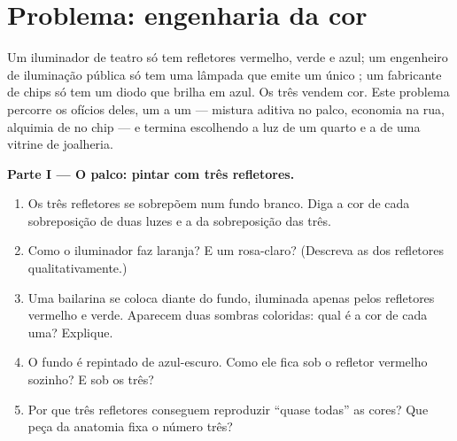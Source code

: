 \section{Problema: engenharia da cor}

\begin{problem}
\label{pb:g11:color-light-sources:1}
Um iluminador de teatro só tem refletores vermelho, verde e azul; um
engenheiro de iluminação pública só tem uma lâmpada que emite um único
; um fabricante de chips só tem um diodo que brilha em
azul. Os três vendem cor. Este problema percorre os ofícios deles, um a
um --- mistura aditiva no palco, economia  na rua, alquimia
de  no chip --- e termina escolhendo a luz de um quarto e a de uma
vitrine de joalheria.

\medskip
\noindent\textbf{Parte I --- O palco: pintar com três refletores.}
\begin{enumerate}
  \item Os três refletores se sobrepõem num fundo branco. Diga a cor de
        cada sobreposição de duas luzes e a da sobreposição das três.
  \item Como o iluminador faz laranja? E um rosa-claro? (Descreva as
         dos refletores qualitativamente.)
  \item Uma bailarina se coloca diante do fundo, iluminada apenas pelos
        refletores vermelho e verde. Aparecem duas sombras coloridas: qual
        é a cor de cada uma? Explique.
  \item O fundo é repintado de azul-escuro. Como ele fica sob o refletor
        vermelho sozinho? E sob os três?
  \item Por que três refletores conseguem reproduzir ``quase todas'' as
        cores? Que peça da anatomia fixa o número três?
\end{enumerate}


\end{problem}
